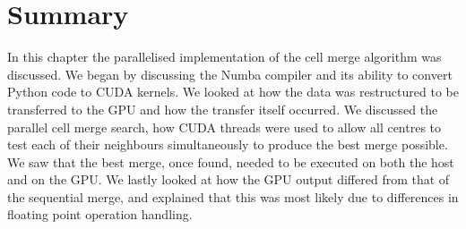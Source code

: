 \section{Summary}
In this chapter the parallelised implementation of the cell merge algorithm was discussed. We began by discussing the Numba compiler and its ability to convert Python code to CUDA kernels. We looked at how the data was restructured to be transferred to the GPU and how the transfer itself occurred. We discussed the parallel cell merge search, how CUDA threads were used to allow all centres to test each of their neighbours simultaneously to produce the best merge possible. We saw that the best merge, once found, needed to be executed on both the host and on the GPU. We lastly looked at how the GPU output differed from that of the sequential merge, and explained that this was most likely due to differences in floating point operation handling.